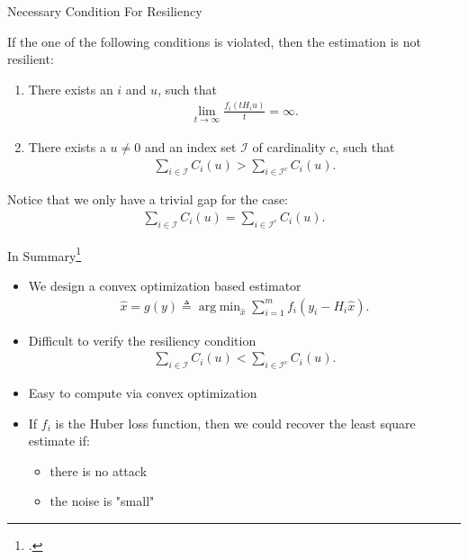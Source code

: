 \documentclass[10pt]{beamer}
\DeclareMathOperator{\argmin}{arg\;min}
\begin{document}
\begin{frame}{Necessary Condition For Resiliency}
  \begin{theorem}
    If the one of the following conditions is violated, then the estimation is not resilient:
    \begin{enumerate}
      \item There exists an $i$ and $u$, such that
	\begin{align*}
 \lim_{t\rightarrow\infty}\frac{f_i(tH_iu)}{t} = \infty.
	\end{align*}
      \item There exists a $u\neq 0$ and an index set $\mathcal I$ of cardinality $c$, such that
	\begin{align*}
	  \sum_{i\in \mathcal I} C_i(u) > \sum_{i\in \mathcal I^c} C_i(u). 
	\end{align*}
    \end{enumerate}
  \end{theorem}
  Notice that we only have a trivial gap for the case:
\begin{align*}
  \sum_{i\in \mathcal I} C_i(u) = \sum_{i\in \mathcal I^c} C_i(u).
\end{align*}	  
\end{frame}

\begin{frame}{In Summary\footcite{Han2019}}
  \begin{itemize}
    \item We design a convex optimization based estimator
  \begin{align*}
    \hat x = g(y) \triangleq \argmin_{\hat x} \sum_{i=1}^m f_i(y_i-H_i \hat x).
  \end{align*}
    \item Difficult to verify the resiliency condition
      \begin{align*}
	\sum_{i\in \mathcal I} C_i(u) < \sum_{i\in \mathcal I^c} C_i(u). 
      \end{align*}
    \item Easy to compute via convex optimization
    \item If $f_i$ is the Huber loss function, then we could recover the least square estimate if:
      \begin{itemize}
	\item there is no attack
	\item the noise is "small"
      \end{itemize}
  \end{itemize}
\end{frame}
\end{document}
